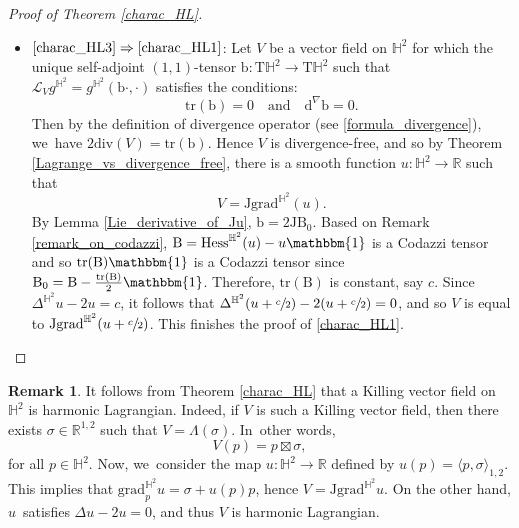 \documentclass[10pt]{amsart}
\theoremstyle{plain}
\theoremstyle{definition}
\newtheorem{remark}[cor]{Remark}
\newcommand{\bb}{\mathrm{b}}
\newcommand{\minko}{\mathbb{R}^{1,2}}
\newcommand{\grad}{\mathrm{grad}^{\mathbb{H}^2}}
\newcommand{\hess}{\mathrm{Hess}^{\mathbb{H}^2}}
\newcommand{\J}{\mathrm{J}}
\newcommand{\B}{\mathrm{B}}
\newcommand{\inner}[1] {\langle #1 \rangle}
\begin{document}
\begin{proof}[Proof of Theorem \ref{charac_HL}]
\begin{itemize}
\item
$\eqref{charac_HL3}\Rightarrow\eqref{charac_HL1}$: Let \(V \) be a vector field on \(\mathbb{H}^2\) for which the unique self-adjoint \((1,1)\)-tensor \(\bb: \mathrm{T}\mathbb{H}^2 \to \mathrm{T}\mathbb{H}^2\) such that \(\mathcal{L}_V g^{\mathbb{H}^2} = g^{\mathbb{H}^2}(\bb \cdot, \cdot)\) satisfies the conditions:
\[
\mathrm{tr}(\bb) = 0 \quad \text{and} \quad \mathrm{d}^{\nabla} \bb = 0.
\]
Then by the definition of divergence operator (see \eqref{formula_divergence}), we~have $2\mathrm{div}(V)=\mathrm{tr}(\mathrm{b})$. Hence \(V \) is divergence-free, and so by Theorem \ref{Lagrange_vs_divergence_free}, there is a smooth function \hbox{\(u:\mathbb{H}^2 \to \mathbb{R} \)} such that
\[ V = \J \grad(u). \]
By Lemma \ref{Lie_derivative_of_Ju}, \(\bb = 2 \J \B_0\). Based on Remark \ref{remark_on_codazzi}, \(\B = \hess(u) - u \mathbbm{1}\) is a Codazzi tensor and so \(\mathrm{tr}(\B)\mathbbm{1}\) is a Codazzi tensor since \(\B_0 = \B - \frac{\mathrm{tr}(\B)}{2} \mathbbm{1}\). Therefore, \(\mathrm{tr}(\B)\) is constant, say \(c \). Since \(\Delta^{\mathbb{H}^2} u - 2u = c\), it follows that \(\Delta^{\mathbb{H}^2}(u + \sfrac{c}{2}) - 2(u + \sfrac{c}{2}) = 0\), and so \(V \) is equal to \(\J \grad(u + \sfrac{c}{2})\). This finishes the proof of \eqref{charac_HL1}.\qedhere
\end{itemize}
\end{proof}

\begin{remark}\label{Killing_are_harmonic}
It follows from Theorem \ref{charac_HL} that a Killing vector field on $\mathbb{H}^2$ is harmonic Lagrangian. Indeed, if $V$ is such a Killing vector field, then there exists $\sigma\in\minko$ such that $V=\Lambda(\sigma)$. In~other words,
\[
V(p)=p\boxtimes\sigma,
\]
for all $p\in\mathbb{H}^2$. Now, we~consider the map $u:\mathbb{H}^2\to\mathbb{R}$ defined by $u(p)=\inner{p,\sigma}_{1,2}$. This implies that $\grad_p u=\sigma+u(p)p$, hence $V=\J\grad u$. On the other hand, $u$~satisfies $\Delta u-2u=0$, and thus $V$ is harmonic Lagrangian.
\end{remark}
\end{document}
